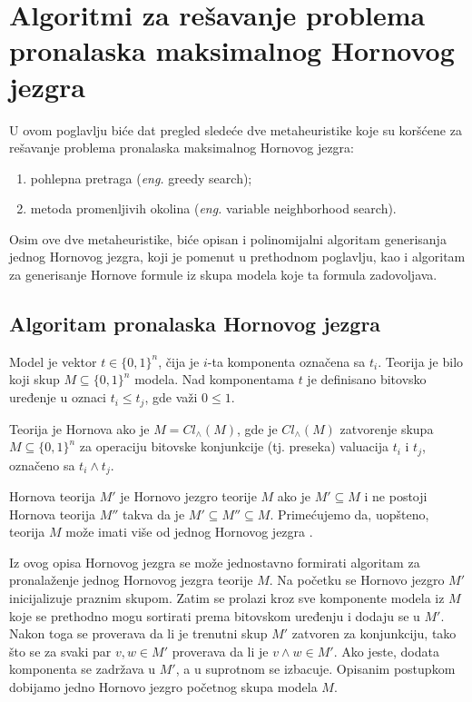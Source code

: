 \documentclass[12pt,oneside]{memoir}
\begin{document}
\chapter{Algoritmi za rešavanje problema pronalaska maksimalnog Hornovog jezgra}
U ovom poglavlju biće dat pregled sledeće dve metaheuristike koje su koršćene za rešavanje problema pronalaska maksimalnog Hornovog jezgra:
\label{chap:algoritmi}

\begin{enumerate}
  \item pohlepna pretraga (\textit{eng.} greedy search);
  \item metoda promenljivih okolina (\textit{eng.} variable neighborhood search).
\end{enumerate}
Osim ove dve metaheuristike, biće opisan i polinomijalni algoritam generisanja jednog Hornovog jezgra, koji je pomenut u prethodnom poglavlju, kao i algoritam za generisanje Hornove formule iz skupa modela koje ta formula zadovoljava.

\section{Algoritam pronalaska Hornovog jezgra}

Model je vektor $t \in \{0,1\}^n$, čija je $i$-ta komponenta označena sa $t_i$. Teorija je bilo koji skup $M \subseteq \{0,1\}^n$ modela. Nad komponentama $t$ je definisano bitovsko uređenje u oznaci $t_i \leq t_j$, gde važi $0 \leq 1$. 

Teorija je Hornova ako je $M = Cl_{\land}(M)$, gde je $Cl_{\land}(M)$ zatvorenje skupa $M \subseteq \{0,1\}^n$ za operaciju bitovske konjunkcije (tj. preseka) valuacija $t_i$ i $t_j$, označeno sa $t_i \land t_j$.

Hornova teorija $M'$ je Hornovo jezgro teorije $M$ ako je $M' \subseteq M$ i ne postoji Hornova teorija $M''$ takva da je $M' \subseteq M'' \subseteq M$. Primećujemo da, uopšteno, teorija $M$ može imati više od jednog Hornovog jezgra \cite{doc1}.

Iz ovog opisa Hornovog jezgra se može jednostavno formirati algoritam za pronalaženje jednog Hornovog jezgra teorije $M$. Na početku se Hornovo jezgro $M'$ inicijalizuje praznim skupom. Zatim se prolazi kroz sve komponente modela iz $M$ koje se prethodno mogu sortirati prema bitovskom uređenju i dodaju se u $M'$. Nakon toga se proverava da li je trenutni skup $M'$ zatvoren za konjunkciju, tako što se za svaki par $v, w \in M'$ proverava da li je $v \land w \in M'$. Ako jeste, dodata komponenta se zadržava u $M'$, a u suprotnom se izbacuje. Opisanim postupkom dobijamo jedno Hornovo jezgro početnog skupa modela $M$.\\
\end{document}
